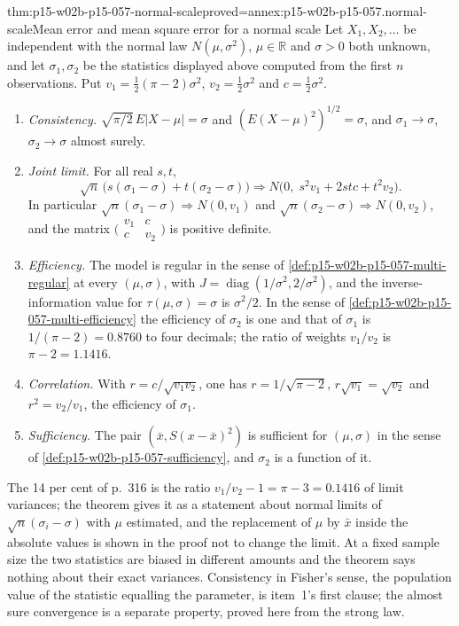 \begin{hbtheorem}{thm:p15-w02b-p15-057-normal-scale}{proved=annex:p15-w02b-p15-057.normal-scale}{Mean error and mean square error for a normal scale}
Let \(X_1,X_2,\ldots\) be independent with the normal law
\(N(\mu,\sigma^2)\), \(\mu\in\mathbb R\) and \(\sigma>0\) both unknown,
and let \(\sigma_1,\sigma_2\) be the statistics displayed above computed
from the first \(n\) observations. Put
\(v_1=\tfrac12(\pi-2)\sigma^2\), \(v_2=\tfrac12\sigma^2\) and
\(c=\tfrac12\sigma^2\).
\begin{enumerate}
\item \emph{Consistency.} \(\sqrt{\pi/2}\,E|X-\mu|=\sigma\) and
 \((E(X-\mu)^2)^{1/2}=\sigma\), and \(\sigma_1\to\sigma\),
 \(\sigma_2\to\sigma\) almost surely.
\item \emph{Joint limit.} For all real \(s,t\),
 \[
  \sqrt n\,\bigl(s(\sigma_1-\sigma)+t(\sigma_2-\sigma)\bigr)\Rightarrow
  N\bigl(0,\;s^2v_1+2stc+t^2v_2\bigr).
 \]
 In particular \(\sqrt n(\sigma_1-\sigma)\Rightarrow N(0,v_1)\) and
 \(\sqrt n(\sigma_2-\sigma)\Rightarrow N(0,v_2)\), and the matrix
 \(\bigl(\begin{smallmatrix}v_1&c\\c&v_2\end{smallmatrix}\bigr)\) is
 positive definite.
\item \emph{Efficiency.} The model is regular in the sense of
 \cref{def:p15-w02b-p15-057-multi-regular} at every \((\mu,\sigma)\), with
 \(J=\operatorname{diag}(1/\sigma^2,2/\sigma^2)\), and the
 inverse-information value for \(\tau(\mu,\sigma)=\sigma\) is
 \(\sigma^2/2\). In the sense of
 \cref{def:p15-w02b-p15-057-multi-efficiency} the efficiency of
 \(\sigma_2\) is one and that of \(\sigma_1\) is
 \(1/(\pi-2)=0.8760\) to four decimals; the ratio of weights
 \(v_1/v_2\) is \(\pi-2=1.1416\).
\item \emph{Correlation.} With \(r=c/\sqrt{v_1v_2}\), one has
 \(r=1/\sqrt{\pi-2}\), \(r\sqrt{v_1}=\sqrt{v_2}\) and \(r^2=v_2/v_1\),
 the efficiency of \(\sigma_1\).
\item \emph{Sufficiency.} The pair \((\bar x,S(x-\bar x)^2)\) is
 sufficient for \((\mu,\sigma)\) in the sense of
 \cref{def:p15-w02b-p15-057-sufficiency}, and \(\sigma_2\) is a function
 of it.
\end{enumerate}
\end{hbtheorem}

The 14 per cent of p.~316 is the ratio \(v_1/v_2-1=\pi-3=0.1416\) of
limit variances; the theorem gives it as a statement about normal limits
of \(\sqrt n(\sigma_i-\sigma)\) with \(\mu\) estimated, and the
replacement of \(\mu\) by \(\bar x\) inside the absolute values is shown in
the proof not to change the limit. At a fixed sample size the two
statistics are biased in different amounts and the theorem says nothing
about their exact variances. Consistency in Fisher's sense, the population
value of the statistic equalling the parameter, is item~1's first clause;
the almost sure convergence is a separate property, proved here from the
strong law.

